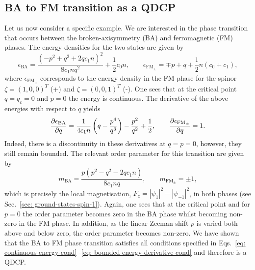 \subsection{BA to FM transition as a QDCP}
Let us now consider a specific example.
We are interested in the phase transition that occurs between the
broken-axisymmetry (BA) and ferromagnetic (FM) phases.
The energy densities for the two states are given by~\cite{Kawaguchi2012}
\begin{equation}
    \epsilon_\mathrm{BA} = \frac{{(-p^2 + q^2 +2qc_1n)}^2}{8c_1nq^2}
    + \frac{1}{2}c_0n, \qquad
    \epsilon_\mathrm{FM_{\pm}} = \mp p + q + \frac{1}{2}n(c_0 + c_1),
\end{equation}
where \( \epsilon_\mathrm{FM_{\pm}} \) corresponds to the energy density in the
FM phase for the spinor \( \zeta = {(1, 0, 0)}^T \) (+) and
\( \zeta = {(0, 0, 1)}^T \) (-).
One sees that at the critical point \( q=q_c=0 \) and \( p=0 \) the energy is
continuous.
The derivative of the above energies with respect to \( q \) yields
\begin{equation}
    \pdv{\epsilon_\mathrm{BA}}{q} =
    \frac{1}{4c_1n}\left(q - \frac{p^4}{q^3}\right) - \frac{p^2}{q^2}
    + \frac{1}{2},
    \qquad
    \pdv{\epsilon_\mathrm{FM_{\pm}}}{q} = 1.
\end{equation}
Indeed, there is a discontinuity in these derivatives at \( q=p=0 \), however,
they still remain bounded.
The relevant order parameter for this transition are given by
\begin{equation}
    m_\mathrm{BA} = \frac{p(p^2 - q^2 - 2qc_1n)}{8c_1nq},
    \qquad
    m_{\mathrm{FM}_{\pm}} = \pm 1,
\end{equation}
which is precisely the local magnetisation, \(F_z = |\psi_1|^2
- |\psi_{-1}|^2\), in both phases (see Sec.~\ref{sec: ground-states-spin-1}).
Again, one sees that at the critical point and for \( p=0 \) the order parameter
becomes zero in the BA phase whilst becoming non-zero in the FM phase.
In addition, as the linear Zeeman shift \( p \) is varied both above and below
zero, the order parameter becomes non-zero.
We have shown that the BA to FM phase transition satisfies all conditions
specified in Eqs.~\eqref{eq: continuous-energy-cond}
-\eqref{eq: bounded-energy-derivative-cond}
and therefore is a QDCP\@.

